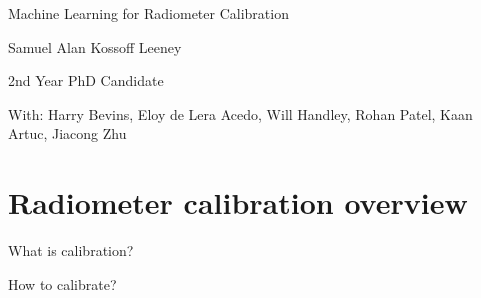 \documentclass[aspectratio=169]{beamer}
\begin{document}
\begin{frame}
	\begin{center}
		{\huge Machine Learning for Radiometer Calibration\par}
		\vspace{0.5cm}


		{\large Samuel Alan Kossoff Leeney\par}

		{\small 2nd Year PhD Candidate\par}
		\vspace{0.5cm}


		{\footnotesize With: Harry Bevins, Eloy de Lera Acedo, Will Handley, Rohan Patel, Kaan Artuc, Jiacong Zhu \par}

		\vfill

		


	\end{center}
	\vfill
\end{frame}
\section{Radiometer calibration overview}
\begin{frame}{\small{What is calibration?}}
	\begin{figure}[h]
		\centering
		
	\end{figure}
	\vfill
\end{frame}

\begin{frame}{\small{How to calibrate?}}
	\begin{figure}[h]
		\centering
		
	\end{figure}
	\vspace{0.7cm}
	\vfill
\end{frame}
\end{document}
